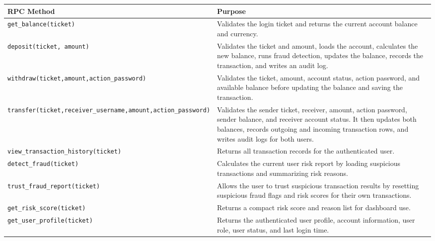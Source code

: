 \documentclass[12pt,a4paper]{article}
\begin{document}
\begingroup
\small
\setlength{\tabcolsep}{4pt}
\begin{longtable}{|p{5.7cm}|p{8.3cm}|}
\hline
\textbf{RPC Method} & \textbf{Purpose} \\
\hline
\texttt{get\_balance(ticket)} & Validates the login ticket and returns the current account balance and currency. \\
\hline
\texttt{deposit(ticket, amount)} & Validates the ticket and amount, loads the account, calculates the new balance, runs fraud detection, updates the balance, records the transaction, and writes an audit log. \\
\hline
\texttt{withdraw(ticket,}\newline\texttt{amount,}\newline\texttt{action\_password)} & Validates the ticket, amount, account status, action password, and available balance before updating the balance and saving the transaction. \\
\hline
\texttt{transfer(ticket,}\newline\texttt{receiver\_username,}\newline\texttt{amount,}\newline\texttt{action\_password)} & Validates the sender ticket, receiver, amount, action password, sender balance, and receiver account status. It then updates both balances, records outgoing and incoming transaction rows, and writes audit logs for both users. \\
\hline
\texttt{view\_transaction}\newline\texttt{\_history(ticket)} & Returns all transaction records for the authenticated user. \\
\hline
\texttt{detect\_fraud(ticket)} & Calculates the current user risk report by loading suspicious transactions and summarizing risk reasons. \\
\hline
\texttt{trust\_fraud}\newline\texttt{\_report(ticket)} & Allows the user to trust suspicious transaction results by resetting suspicious fraud flags and risk scores for their own transactions. \\
\hline
\texttt{get\_risk}\newline\texttt{\_score(ticket)} & Returns a compact risk score and reason list for dashboard use. \\
\hline
\texttt{get\_user}\newline\texttt{\_profile(ticket)} & Returns the authenticated user profile, account information, user role, user status, and last login time. \\

\end{longtable}
\end{document}
